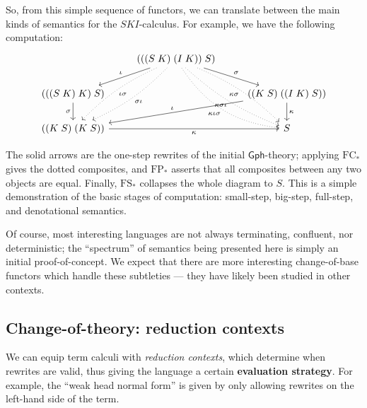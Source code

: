 \documentclass{amsart}
\theoremstyle{definition}
\newcommand{\Gph}{\mathsf{Gph}}
\newcommand{\FC}{\mathrm{FC}}
\newcommand{\FP}{\mathrm{FP}}
\newcommand{\FS}{\mathrm{FS}}
\begin{document}
So, from this simple sequence of functors, we can translate between the main kinds of semantics for the $SKI$-calculus. For example, we have the following computation:
\[\begin{tikzcd}
&	(((S\; K)\; (I\; K))\; S) \arrow[rd,"\sigma"] \arrow[ld,swap,"\iota"] \arrow[ddl,dotted,bend left=10,"\sigma\iota"] \arrow[ddl,dotted,bend right=10,"\iota\sigma"] \arrow[ddr,dotted,swap,bend left=10,"\kappa\sigma"] \arrow[ddr,dotted,bend right=10,swap,"\kappa\sigma\iota"] \arrow[ddr,dotted,swap,bend right=25,"\kappa\iota\sigma"] &\\
(((S\; K)\; K)\; S) \arrow[d,swap,"\sigma"] & & ((K\; S)\; ((I\; K)\; S)) \arrow[lld,swap,"\iota"] \arrow[d,"\kappa"]\\
((K\; S)\; (K\; S)) \arrow[rr,swap,"\kappa"] & & S
\end{tikzcd}\]

The solid arrows are the one-step rewrites of the initial $\Gph$-theory; applying $\FC_*$ gives the dotted composites, and $\FP_*$ asserts that all composites between any two objects are equal. Finally, $\FS_*$ collapses the whole diagram to $S$. This is a simple demonstration of the basic stages of computation: small-step, big-step, full-step, and denotational semantics.

Of course, most interesting languages are not always terminating, confluent, nor deterministic; the ``spectrum'' of semantics being presented here is simply an initial proof-of-concept. We expect that there are more interesting change-of-base functors which handle these subtleties --- they have likely been studied in other contexts.

\subsection{Change-of-theory: reduction contexts}
We can equip term calculi with \textit{reduction contexts}, which determine when rewrites are valid, thus giving the language a certain \textbf{evaluation strategy}. For example, the ``weak head normal form'' is given by only allowing rewrites on the left-hand side of the term.
\end{document}
